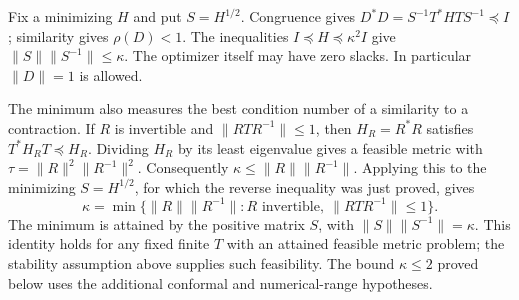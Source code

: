 \documentclass[11pt]{article}
\theoremstyle{definition}
\theoremstyle{remark}
\numberwithin{equation}{section}
\begin{document}
Fix a minimizing $H$ and put $S=H^{1/2}$. Congruence gives
$D^*D=S^{-1}T^*HTS^{-1}\preceq I$; similarity gives $\rho(D)<1$.
The inequalities $I\preceq H\preceq\kappa^2I$ give
$\|S\|\|S^{-1}\|\le\kappa$. The optimizer itself may have zero
slacks. In particular $\|D\|=1$ is allowed.

The minimum also measures the best condition number of a similarity to
a contraction. If $R$ is invertible and $\|RTR^{-1}\|\le1$, then
$H_R=R^*R$ satisfies $T^*H_RT\preceq H_R$. Dividing $H_R$ by its
least eigenvalue gives a feasible metric with
$\tau=\|R\|^2\|R^{-1}\|^2$. Consequently
$\kappa\le\|R\|\|R^{-1}\|$. Applying this to the minimizing
$S=H^{1/2}$, for which the reverse inequality was just proved, gives
\begin{equation}\label{eq:optimal-similarity}
 \kappa=\min\{\|R\|\|R^{-1}\|:
 R\text{ invertible},\ \|RTR^{-1}\|\le1\}.
\end{equation}
The minimum is attained by the positive matrix $S$, with
$\|S\|\|S^{-1}\|=\kappa$. This identity holds for any fixed finite
$T$ with an attained feasible metric problem; the stability assumption
above supplies such feasibility. The bound $\kappa\le2$ proved below
uses the additional conformal and numerical-range hypotheses.
\end{document}
